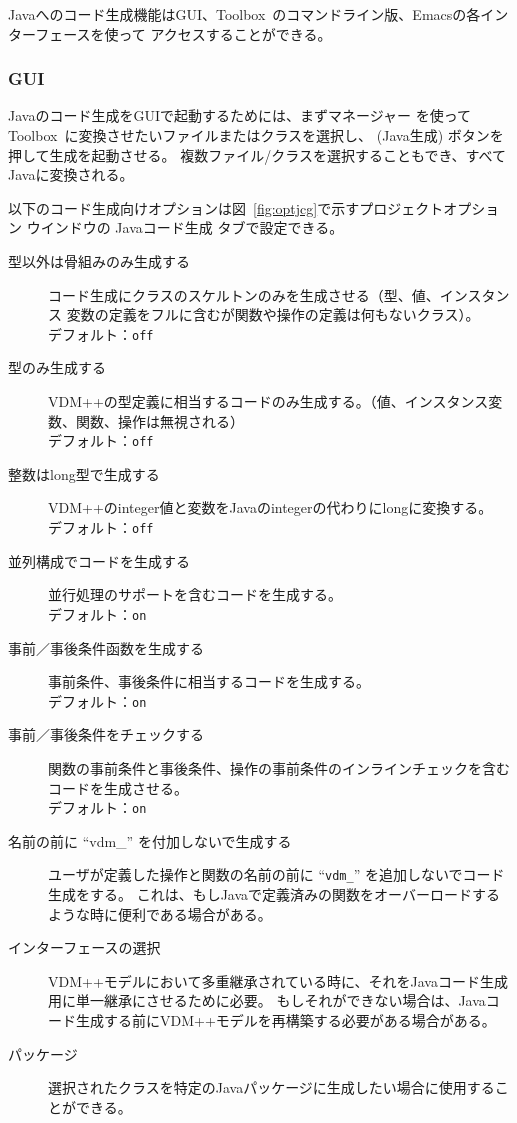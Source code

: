 \documentclass[\pformat,12pt]{jarticle}
\newcommand{\Toolbox}{Toolbox}
\newcommand{\guicmd}[1]{{\gt #1}}
\begin{document}
Javaへのコード生成機能はGUI、\Toolbox\ のコマンドライン版、Emacsの各インターフェースを使って
アクセスすることができる。

\subsubsection{GUI}


Javaのコード生成をGUIで起動するためには、まず\guicmd{マネージャー} を使って
\Toolbox\ に変換させたいファイルまたはクラスを選択し、
(\guicmd{Java生成}) ボタンを押して生成を起動させる。
複数ファイル/クラスを選択することもでき、すべてJavaに変換される。

以下のコード生成向けオプションは図~\ref{fig:optjcg}で示す\guicmd{プロジェクトオプション} ウインドウの
\guicmd{Javaコード生成} タブで設定できる。

\begin{description}


\item[型以外は骨組みのみ生成する]
  コード生成にクラスのスケルトンのみを生成させる（型、値、インスタンス
  変数の定義をフルに含むが関数や操作の定義は何もないクラス）。 \\
  デフォルト：\texttt{off}
\item[型のみ生成する]
  VDM++の型定義に相当するコードのみ生成する。（値、インスタンス変数、関数、操作は無視される） \\
  デフォルト：\texttt{off}
\item[整数はlong型で生成する]
  VDM++のinteger値と変数をJavaのintegerの代わりにlongに変換する。 \\
  デフォルト：\texttt{off}
\item[並列構成でコードを生成する]
  並行処理のサポートを含むコードを生成する。 \\
  デフォルト：\texttt{on}
\item[事前／事後条件函数を生成する]
  事前条件、事後条件に相当するコードを生成する。 \\
  デフォルト：\texttt{on}
\item[事前／事後条件をチェックする]
  関数の事前条件と事後条件、操作の事前条件のインラインチェックを含むコードを生成させる。 \\
  デフォルト：\texttt{on}
\item[名前の前に ``vdm\_'' を付加しないで生成する]
  ユーザが定義した操作と関数の名前の前に ``\texttt{vdm\_}'' を追加しないでコード生成をする。
  これは、もしJavaで定義済みの関数をオーバーロードするような時に便利である場合がある。
\item[インターフェースの選択]
  VDM++モデルにおいて多重継承されている時に、それをJavaコード生成用に単一継承にさせるために必要。
  もしそれができない場合は、Javaコード生成する前にVDM++モデルを再構築する必要がある場合がある。
\item[パッケージ]
  選択されたクラスを特定のJavaパッケージに生成したい場合に使用することができる。
\end{description}
\end{document}
